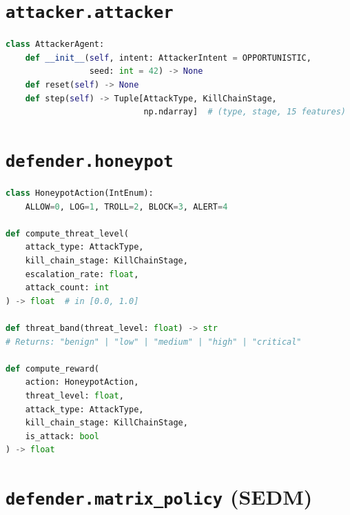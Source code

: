 \section{\texttt{attacker.attacker}}

\begin{lstlisting}[language=Python, caption={AttackerAgent interface.}]
class AttackerAgent:
    def __init__(self, intent: AttackerIntent = OPPORTUNISTIC,
                 seed: int = 42) -> None
    def reset(self) -> None
    def step(self) -> Tuple[AttackType, KillChainStage,
                            np.ndarray]  # (type, stage, 15 features)
\end{lstlisting}

\section{\texttt{defender.honeypot}}

\begin{lstlisting}[language=Python, caption={Honeypot action and reward computation.}]
class HoneypotAction(IntEnum):
    ALLOW=0, LOG=1, TROLL=2, BLOCK=3, ALERT=4

def compute_threat_level(
    attack_type: AttackType,
    kill_chain_stage: KillChainStage,
    escalation_rate: float,
    attack_count: int
) -> float  # in [0.0, 1.0]

def threat_band(threat_level: float) -> str
# Returns: "benign" | "low" | "medium" | "high" | "critical"

def compute_reward(
    action: HoneypotAction,
    threat_level: float,
    attack_type: AttackType,
    kill_chain_stage: KillChainStage,
    is_attack: bool
) -> float
\end{lstlisting}

\section{\texttt{defender.matrix\_policy} (SEDM)}

